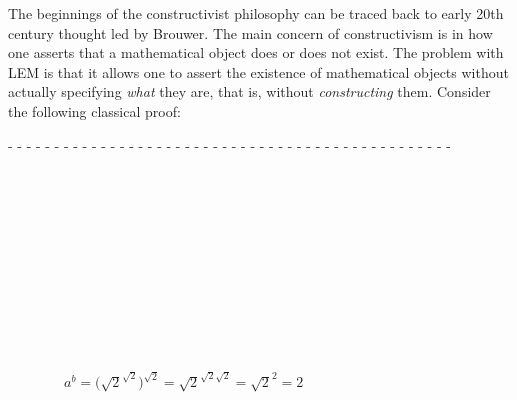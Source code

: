 \documentclass[oneside,12pt]{article}
\begin{document}
The beginnings of the constructivist philosophy can be traced back to early 20th century thought led by Brouwer. The main concern of constructivism is in how one asserts that a mathematical object does or does not exist. The problem with LEM is that it allows one to assert the existence of mathematical objects without actually specifying \emph{what} they are, that is, without \emph{constructing} them. Consider the following classical proof:


\begin{center}
- - - - - - - - - - - - - - - - - - - - - - - - - - - - - - - - - - - - - - - - - - - - - - - -
\end{center}


{\small

\vspace{-0.5em}


\vspace{0.5em}




\vspace{0.5em}


$\qquad \qquad$

$\qquad \qquad$

$\qquad \qquad$



$\qquad \qquad$

$\qquad \qquad$

$\qquad \qquad$

$\qquad \qquad a^{b} = \bigl(\sqrt{2}^{\sqrt{2}}\bigr)^{\sqrt{2}} = \sqrt{2}^{\sqrt{2} \sqrt{2}} = \sqrt{2}^{2} = 2$

$\qquad \qquad$

\vspace{0.5em}


}
\end{document}
